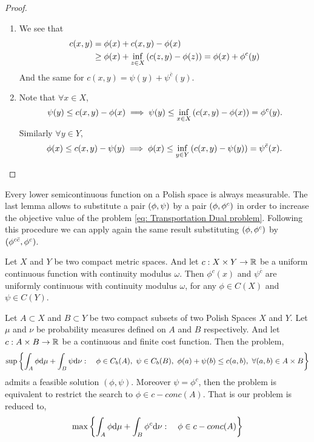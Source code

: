 \begin{proof}

\begin{enumerate}
\item  We see that 
\begin{align*}
c(x,y)&=\phi(x)+c(x,y)-\phi(x)\\
		&\geq\phi(x)+\inf_{z\in X} \left( c(z,y)-\phi(z) \right)=\phi(x)+\phi^c(y)
\end{align*}
And the same for $c(x,y)=\psi(y)+\psi^{\bar c}(y)$.

\item  Note that $\forall x\in X$,
\begin{equation*}
\psi(y)\leq c(x,y)-\phi(x)\implies\psi(y)\leq \inf_{x\in X}\left( c(x,y)-\phi(x) \right)=\phi^c(y). 
\end{equation*}	
Similarly $\forall y \in Y$,
\begin{equation*}
\phi(x)\leq c(x,y)-\psi(y)\implies\phi(x)\leq\inf_{y\in Y}\left( c(x,y)-\psi(y) \right)=\psi^{\bar{c}}(x).
\end{equation*}	
\end{enumerate}	
	
\end{proof}
Every lower semicontinuous function on a Polish space is always measurable. The last lemma allows to substitute a pair $\left( \phi, \psi \right)$ by a pair $\left( \phi,\phi^c \right)$ in order to increase the objective value of the problem \eqref{eq: Transportation Dual problem}. Following this procedure we can  apply again the same result substituting $\left( \phi,\phi^c \right)$ by $\left( \phi^{c\bar c}, \phi^c \right)$.  \\
\begin{lemma}
	Let $X$ and $Y$ be two compact metric spaces. And let $c:X\times Y \rightarrow \mathbb{R}$ be a uniform continuous function with continuity modulus $\omega$. Then $\phi^c(x)$ and $\psi^{\bar{c}}$ are uniformly continuous with continuity modulus $\omega$, for any $\phi\in C(X)$ and $\psi\in C(Y)$.
\end{lemma}
\begin{theorem}
	Let $A\subset X$ and $B\subset Y$ be two compact subsets of two Polish Spaces $X$ and $Y$. Let $\mu$ and $\nu$ be probability measures defined on $A$ and $B$ respectively. And let $c:A\times B\rightarrow \mathbb{R}$ be a continuous and finite cost function. Then the problem, 
	\begin{equation*}
		\sup\braces{\int_A \phi \dmu+\int_B \psi \dnu:\quad \phi\in C_b(A),\ \psi \in C_b(B),\ \phi(a)+\psi(b)\leq c(a,b),\ \forall (a,b)\in A\times B}
	\end{equation*} 
	admits a feasible solution $(\phi, \psi)$. Moreover $\psi=\phi^c$, then the problem is equivalent to restrict the search to $\phi\in c-conc(A)$. That is our problem is reduced to,
	\begin{equation}
		\max\left\lbrace \int_A \phi \mathrm{d}\mu+\int_B \phi^c \mathrm{d}\nu:\quad \phi\in c-conc(A) \right\rbrace
	\end{equation}
\end{theorem}
